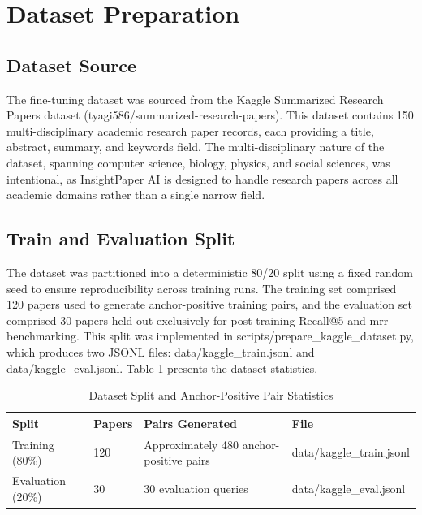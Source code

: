 \section{Dataset Preparation}

\subsection{Dataset Source}

The fine-tuning dataset was sourced from the Kaggle Summarized Research Papers dataset (tyagi586/summarized-research-papers). This dataset contains 150 multi-disciplinary academic research paper records, each providing a title, abstract, summary, and keywords field. The multi-disciplinary nature of the dataset, spanning computer science, biology, physics, and social sciences, was intentional, as InsightPaper AI is designed to handle research papers across all academic domains rather than a single narrow field.

\subsection{Train and Evaluation Split}

The dataset was partitioned into a deterministic 80/20 split using a fixed random seed to ensure reproducibility across training runs. The training set comprised 120 papers used to generate anchor-positive training pairs, and the evaluation set comprised 30 papers held out exclusively for post-training Recall@5 and \gls{mrr} benchmarking. This split was implemented in scripts/prepare\_kaggle\_dataset.py, which produces two JSONL files: data/kaggle\_train.jsonl and data/kaggle\_eval.jsonl. Table \ref{tab:split} presents the dataset statistics.

\begin{table}[H]

\centering

\caption{Dataset Split and Anchor-Positive Pair Statistics}

\label{tab:split}

\begin{tabular}{|p{3.5cm}|p{2.5cm}|p{4cm}|p{3cm}|}

\hline

\textbf{Split} & \textbf{Papers} & \textbf{Pairs Generated} & \textbf{File} \\

\hline

Training (80\%) & 120 & Approximately 480 anchor-positive pairs & data/kaggle\_train.jsonl \\

\hline

Evaluation (20\%) & 30 & 30 evaluation queries & data/kaggle\_eval.jsonl \\

\hline

\end{tabular}

\end{table}

